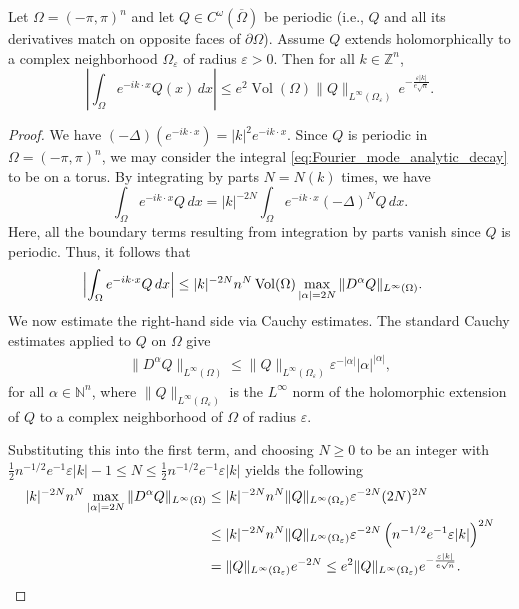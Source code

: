 \documentclass[10pt,a4paper]{amsart}
\begin{document}
\begin{lemma}\label{Fourier_restriction_decay}
Let $\Omega = (-\pi, \pi)^n$ and let $Q \in C^\omega(\overline{\Omega})$ be periodic 
(i.e., $Q$ and all its derivatives match on opposite faces of $\partial\Omega$). 
Assume $Q$ extends holomorphically to a complex neighborhood $\Omega_\varepsilon$ 
of radius $\varepsilon > 0$. Then for all $k \in \mathbb{Z}^n$,
\begin{equation}\label{eq:Fourier_mode_analytic_decay}
\left| \int_\Omega e^{-ik\cdot x} Q(x) \, dx \right| 
\leq e^2 \operatorname{Vol}(\Omega) \|Q\|_{L^\infty(\Omega_\varepsilon)} \, 
e^{-\frac{\varepsilon |k|}{e\sqrt{n}}}.
\end{equation}
\end{lemma}

\begin{proof}
We have $(-\Delta)(e^{-ik\cdot x}) = |k|^{2} e^{-ik\cdot x}$. Since $Q$ is periodic in $\Omega = (-\pi, \pi)^n$, we may consider the integral \eqref{eq:Fourier_mode_analytic_decay} to be on a torus. By integrating by parts $N=N(k)$ times, we have 
\begin{equation*}
\int_\Omega e^{-ik \cdot x} Q \, dx
= |k|^{-2N} \int_\Omega e^{-ik \cdot x} (-\Delta)^N Q \, dx. 
\end{equation*}
Here, all the boundary terms resulting from integration by parts vanish since $Q$ is periodic. Thus, it follows that 
\begin{align*}
    \Bigl|\int_\Omega e^{-ik\cdot x} Q \, dx\Bigr| 
    &\leq |k|^{-2N} n^{N} \operatorname{Vol}(\Omega) 
       \max_{|\alpha|=2N} \|D^\alpha Q\|_{L^\infty(\Omega)}.
\end{align*}
We now estimate the right-hand side via Cauchy estimates. 
The standard Cauchy estimates applied to $Q$ on $\Omega$ give
\begin{align*}
    \|D^\alpha Q\|_{L^\infty(\Omega)}
    \leq \|Q\|_{L^\infty(\Omega_\varepsilon)} 
       \varepsilon^{-|\alpha|} |\alpha|^{|\alpha|},
\end{align*}
for all $\alpha\in \mathbb{N}^n$, where $\|Q\|_{L^\infty(\Omega_\varepsilon)}$ 
is the $L^\infty$ norm of the holomorphic extension of $Q$ to a 
complex neighborhood of $\Omega$ of radius $\varepsilon$.


% 
Substituting this into the first term, and choosing $N \geq 0$ to be an integer with $\frac{1}{2} n^{-1/2}e^{-1}\varepsilon |k| - 1 \leq N \leq \frac{1}{2} n^{-1/2}e^{-1}\varepsilon |k|$ yields the following \begin{align*}
|k|^{-2N}n^{N}\max_{|\alpha|=2N}\|D^\alpha Q\|_{L^\infty(\Omega)} &\leq |k|^{-2N}n^{N}\|Q\|_{L^\infty(\Omega_\varepsilon)} \varepsilon^{-2N}(2N)^{2N} \\
&\leq |k|^{-2N}n^{N}\|Q\|_{L^\infty(\Omega_\varepsilon)}\varepsilon^{-2N}\left(n^{-1/2}e^{-1}\varepsilon|k|\right)^{2N} \\
&= \|Q\|_{L^\infty(\Omega_\varepsilon)} e^{-2 N} \leq e^2 \|Q\|_{L^\infty(\Omega_\varepsilon)} e^{- \frac{\varepsilon|k|}{e \sqrt{n}} }. \qedhere
\end{align*}
\end{proof}
\end{document}
